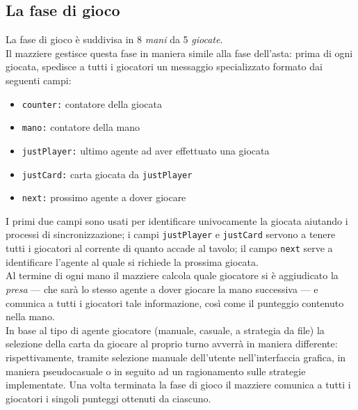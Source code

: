 \subsection{La fase di gioco}
La fase di gioco è suddivisa in 8 \emph{mani} da 5 \emph{giocate}.\\
Il mazziere gestisce questa fase in maniera simile alla fase dell'asta: prima di ogni giocata, spedisce a tutti i giocatori un messaggio specializzato formato dai seguenti campi:
\begin{itemize}
   \item \texttt{counter:} contatore della giocata
   \item \texttt{mano:} contatore della mano
   \item \texttt{justPlayer:} ultimo agente ad aver effettuato una giocata
   \item \texttt{justCard:}   carta giocata da \texttt{justPlayer}
   \item \texttt{next:}   prossimo agente a dover giocare
\end{itemize}
I primi due campi sono usati per identificare univocamente la giocata aiutando i processi di sincronizzazione; i campi \texttt{justPlayer} e \texttt{justCard} servono a tenere tutti i giocatori al corrente di quanto accade al tavolo; il campo \texttt{next} serve a identificare l'agente al quale si richiede la prossima giocata.\\
Al termine di ogni mano il mazziere calcola quale giocatore si è aggiudicato la \emph{presa} --- che sarà lo stesso agente a dover giocare la mano successiva --- e comunica a tutti i giocatori tale informazione, così come il punteggio contenuto nella mano.\\
In base al tipo di agente giocatore (manuale, casuale, a strategia da file) la selezione della carta da giocare al proprio turno avverrà in maniera differente: rispettivamente, tramite selezione manuale dell'utente nell'interfaccia grafica, in maniera pseudocasuale o in seguito ad un ragionamento sulle strategie implementate.
Una volta terminata la fase di gioco il mazziere comunica a tutti i giocatori i singoli punteggi ottenuti da ciascuno.


